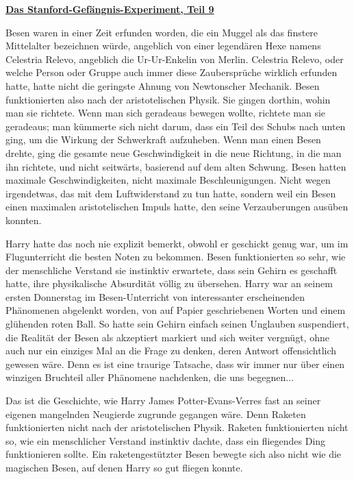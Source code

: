

\hypertarget{das-stanford-gefuxe4ngnis-experiment-teil-9}{%

\textbf{\uline{Das Stanford-Gefängnis-Experiment, Teil 9}}

\hfill\break Besen waren in einer Zeit erfunden worden, die ein Muggel als das finstere Mittelalter bezeichnen würde, angeblich von einer legendären Hexe namens Celestria Relevo, angeblich die Ur-Ur-Enkelin von Merlin. Celestria Relevo, oder welche Person oder Gruppe auch immer diese Zaubersprüche wirklich erfunden hatte, hatte nicht die geringste Ahnung von Newtonscher Mechanik. Besen funktionierten also nach der aristotelischen Physik. Sie gingen dorthin, wohin man sie richtete. Wenn man sich geradeaus bewegen wollte, richtete man sie geradeaus; man kümmerte sich nicht darum, dass ein Teil des Schubs nach unten ging, um die Wirkung der Schwerkraft aufzuheben. Wenn man einen Besen drehte, ging die gesamte neue Geschwindigkeit in die neue Richtung, in die man ihn richtete, und nicht seitwärts, basierend auf dem alten Schwung. Besen hatten maximale Geschwindigkeiten, nicht maximale Beschleunigungen. Nicht wegen irgendetwas, das mit dem Luftwiderstand zu tun hatte, sondern weil ein Besen einen maximalen aristotelischen Impuls hatte, den seine Verzauberungen ausüben konnten.

Harry hatte das noch nie explizit bemerkt, obwohl er geschickt genug war, um im Flugunterricht die besten Noten zu bekommen. Besen funktionierten so sehr, wie der menschliche Verstand sie instinktiv erwartete, dass sein Gehirn es geschafft hatte, ihre physikalische Absurdität völlig zu übersehen. Harry war an seinem ersten Donnerstag im Besen-Unterricht von interessanter erscheinenden Phänomenen abgelenkt worden, von auf Papier geschriebenen Worten und einem glühenden roten Ball. So hatte sein Gehirn einfach seinen Unglauben suspendiert, die Realität der Besen als akzeptiert markiert und sich weiter vergnügt, ohne auch nur ein einziges Mal an die Frage zu denken, deren Antwort offensichtlich gewesen wäre. Denn es ist eine traurige Tatsache, dass wir immer nur über einen winzigen Bruchteil aller Phänomene nachdenken, die uns begegnen...

Das ist die Geschichte, wie Harry James Potter-Evans-Verres fast an seiner eigenen mangelnden Neugierde zugrunde gegangen wäre. Denn Raketen funktionierten nicht nach der aristotelischen Physik. Raketen funktionierten nicht so, wie ein menschlicher Verstand instinktiv dachte, dass ein fliegendes Ding funktionieren sollte. Ein raketengestützter Besen bewegte sich also nicht wie die magischen Besen, auf denen Harry so gut fliegen konnte.

}
